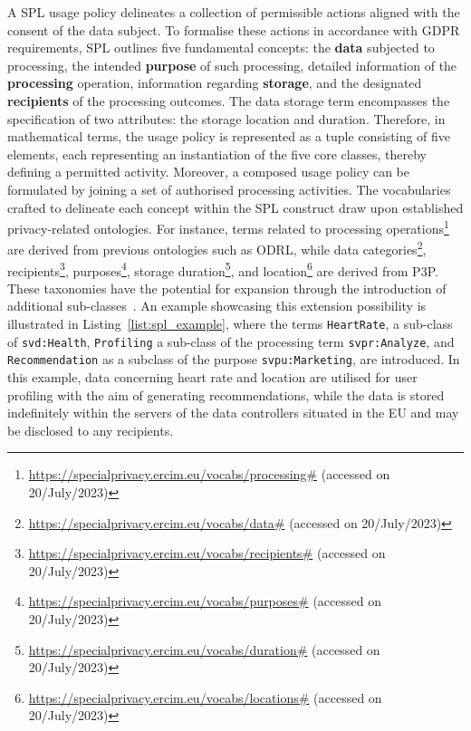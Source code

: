 A SPL usage policy delineates a collection of permissible actions aligned with the consent of the data subject.
To formalise these actions in accordance with GDPR requirements, SPL outlines five fundamental concepts: the \textbf{data} subjected to processing, the intended \textbf{purpose} of such processing, detailed information of the \textbf{processing} operation, information regarding \textbf{storage}, and the designated \textbf{recipients} of the processing outcomes. 
The data storage term encompasses the specification of two attributes: the storage location and duration.
Therefore, in mathematical terms, the usage policy is represented as a tuple consisting of five elements, each representing an instantiation of the five core classes, thereby defining a permitted activity.
Moreover, a composed usage policy can be formulated by joining a set of authorised processing activities.
The vocabularies crafted to delineate each concept within the SPL construct draw upon established privacy-related ontologies.
For instance, terms related to processing operations\footnote{\url{https://specialprivacy.ercim.eu/vocabs/processing\#} (accessed on 20/July/2023)} are derived from previous ontologies such as ODRL, while data categories\footnote{\url{https://specialprivacy.ercim.eu/vocabs/data\#} (accessed on 20/July/2023)}, recipients\footnote{\url{https://specialprivacy.ercim.eu/vocabs/recipients\#} (accessed on 20/July/2023)}, purposes\footnote{\url{https://specialprivacy.ercim.eu/vocabs/purposes\#} (accessed on 20/July/2023)}, storage duration\footnote{\url{https://specialprivacy.ercim.eu/vocabs/duration\#} (accessed on 20/July/2023)}, and location\footnote{\url{https://specialprivacy.ercim.eu/vocabs/locations\#} (accessed on 20/July/2023)} are derived from P3P.
These taxonomies have the potential for expansion through the introduction of additional sub-classes~\citep{bonatti_policy_2018}.
An example showcasing this extension possibility is illustrated in Listing~\ref{list:spl_example}, where the terms \texttt{HeartRate}, a sub-class of \texttt{svd:Health}, \texttt{Profiling} a sub-class of the processing term \texttt{svpr:Analyze}, and \texttt{Recommendation} as a subclass of the purpose \texttt{svpu:Marketing}, are introduced. 
In this example, data concerning heart rate and location are utilised for user profiling with the aim of generating recommendations, while the data is stored indefinitely within the servers of the data controllers situated in the EU and may be disclosed to any recipients.

